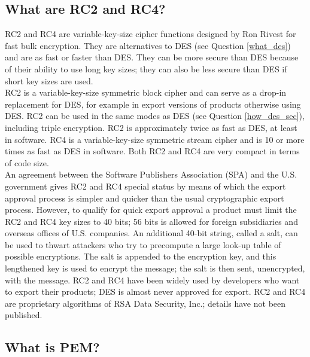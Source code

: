 \subsection{What are RC2 and RC4?}
\label{what_rc}

RC2 and RC4 are variable-key-size cipher functions designed by Ron Rivest
for fast bulk encryption. They are alternatives to DES (see Question
\ref{what_des}) and are as fast or faster than DES. They can be more secure
than DES because of their ability to use long key sizes; they can also be
less secure than DES if short key sizes are used.\\

RC2 is a variable-key-size symmetric block cipher and can serve as a
drop-in replacement for DES, for example in export versions of products
otherwise using DES. RC2 can be used in the same modes as DES (see Question
\ref{how_des_sec}), including triple encryption. RC2 is approximately twice
as fast as DES, at least in software. RC4 is a variable-key-size symmetric
stream cipher and is 10 or more times as fast as DES in software. Both RC2
and RC4 are very compact in terms of code size.\\

An agreement between the Software Publishers Association (SPA) and the
U.S. government gives RC2 and RC4 special status by means of which the
export approval process is simpler and quicker than the usual
cryptographic export process. However, to qualify for quick export
approval a product must limit the RC2 and RC4 key sizes to 40 bits; 56
bits is allowed for foreign subsidiaries and overseas offices of U.S.
companies. An additional 40-bit string, called a salt, can be used to
thwart attackers who try to precompute a large look-up table of
possible encryptions. The salt is appended to the encryption key, and
this lengthened key is used to encrypt the message; the salt is then
sent, unencrypted, with the message. RC2 and RC4 have been widely used
by developers who want to export their products; DES is almost never
approved for export. RC2 and RC4 are proprietary algorithms of RSA Data
Security, Inc.; details have not been published.

\subsection{What is PEM?}
\label{what_pem}

